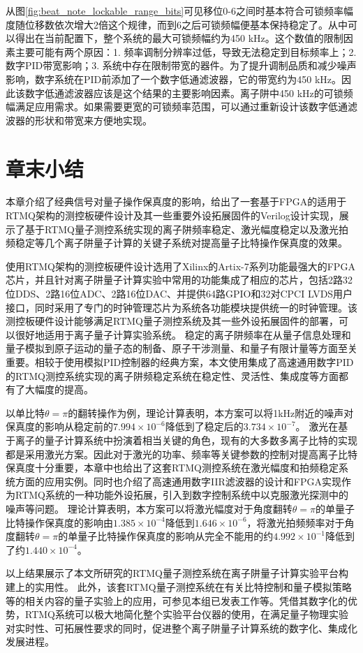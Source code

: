 从图\ref{fig:beat_note_lockable_range_bits}可见移位0-6之间时基本符合可锁频率幅度随位移数依次增大2倍这个规律，而到6之后可锁频幅便基本保持稳定了。从中可以得出在当前配置下，整个系统的最大可锁频幅约为450 kHz。这个数值的限制因素主要可能有两个原因：1. 频率调制分辨率过低，导致无法稳定到目标频率上；2. 数字PID带宽影响；3. 系统中存在限制带宽的器件。为了提升调制品质和减少噪声影响，数字系统在PID前添加了一个数字低通滤波器，它的带宽约为450 kHz。因此该数字低通滤波器应该是这个结果的主要影响因素。离子阱中450 kHz的可锁频幅满足应用需求。如果需要更宽的可锁频率范围，可以通过重新设计该数字低通滤波器的形状和带宽来方便地实现。








\newpage
\section[章末小结]{章末小结}

本章介绍了经典信号对量子操作保真度的影响，给出了一套基于FPGA的适用于RTMQ架构的测控板硬件设计及其一些重要外设拓展固件的Verilog设计实现，展示了基于RTMQ量子测控系统实现的离子阱频率稳定、激光幅度稳定以及激光拍频稳定等几个离子阱量子计算的关键子系统对提高量子比特操作保真度的效果。

使用RTMQ架构的测控板硬件设计选用了Xilinx的Artix-7系列功能最强大的FPGA芯片，并且针对离子阱量子计算实验中常用的功能集成了相应的芯片，包括2路32位DDS、2路16位ADC、2路16位DAC、并提供64路GPIO和32对CPCI LVDS用户接口，同时采用了专门的时钟管理芯片为系统各功能模块提供统一的时钟管理。该测控板硬件设计能够满足RTMQ量子测控系统及其一些外设拓展固件的部署，可以很好地适用于离子量子计算实验系统。
稳定的离子阱频率在从量子信息处理和量子模拟到原子运动的量子态的制备、原子干涉测量、和量子有限计量等方面至关重要。相较于使用模拟PID控制器的经典方案，本文使用集成了高速通用数字PID的RTMQ测控系统实现的离子阱频稳定系统在稳定性、灵活性、集成度等方面都有了大幅度的提高。

以单比特$\theta=\pi$的翻转操作为例，理论计算表明，本方案可以将1kHz附近的噪声对保真度的影响从稳定前的$7.994\times10^{-6}$降低到了稳定后的$3.734\times10^{-7}$。
激光在基于离子的量子计算系统中扮演着相当关键的角色，现有的大多数多离子比特的实现都是采用激光方案。因此对于激光的功率、频率等关键参数的控制对提高离子比特保真度十分重要，本章中也给出了这套RTMQ测控系统在激光幅度和拍频稳定系统方面的应用实例。同时也介绍了高速通用数字IIR滤波器的设计和FPGA实现作为RTMQ系统的一种功能外设拓展，引入到数字控制系统中以克服激光探测中的噪声等问题。
理论计算表明，本方案可以将激光幅度对于角度翻转$\theta=\pi$的单量子比特操作保真度的影响由$1.385\times 10^{-4}$降低到$1.646\times 10^{-6}$，将激光拍频频率对于角度翻转$\theta=\pi$的单量子比特操作保真度的影响从完全不能用的约$4.992\times 10^{-1}$降低到了约$1.440\times 10^{-4}$。


以上结果展示了本文所研究的RTMQ量子测控系统在离子阱量子计算实验平台构建上的实用性。
此外，该套RTMQ量子测控系统在有关比特控制和量子模拟策略等的相关内容的量子实验上的应用，可参见本组已发表工作\cite[]{Zhang_Wang_Wang_Zhang_Wu_Jie_Lu_2022}等。凭借其数字化的优势，RTMQ系统可以极大地简化整个实验平台仪器的使用，在满足量子物理实验对实时性、可拓展性要求的同时，促进整个离子阱量子计算系统的数字化、集成化发展进程。






